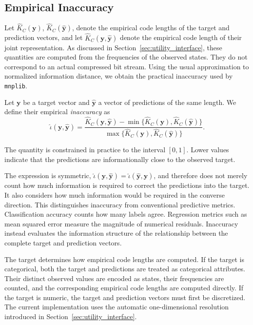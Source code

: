 \subsection*{Empirical Inaccuracy}

Let $\hat K_C(\mathbf{y})$, $\hat K_C(\hat{\mathbf{y}})$, denote the empirical code lengths of the target and prediction vectors, and let $\hat K_C(\mathbf{y},\hat{\mathbf{y}})$ denote the empirical code length of their joint representation. As discussed in Section~\ref{sec:utility_interface}, these quantities are computed from the frequencies of the observed states. They do not correspond to an actual compressed bit stream. Using the usual approximation to normalized information distance, we obtain the practical inaccuracy used by \texttt{mnplib}.

Let $\mathbf{y}$ be a target vector and $\hat{\mathbf{y}}$ a vector of predictions of the same length. We define their empirical \emph{inaccuracy} as
\[
\hat\iota(\mathbf{y},\hat{\mathbf{y}}) = \frac{ \hat K_C(\mathbf{y},\hat{\mathbf{y}})
- \min\{ \hat K_C(\mathbf{y}), \hat K_C(\hat{\mathbf{y}}) \} }{
\max\{ \hat K_C(\mathbf{y}), \hat K_C(\hat{\mathbf{y}}) \} }.
\]

The quantity is constrained in practice to the interval $[0,1]$. Lower values indicate that the predictions are informationally close to the observed target.

The expression is symmetric, $\hat\iota(\mathbf{y},\hat{\mathbf{y}}) = \hat\iota(\hat{\mathbf{y}},\mathbf{y})$, and therefore does not merely count how much information is required to correct the predictions into the target. It also considers how much information would be required in the converse direction. This distinguishes inaccuracy from conventional predictive metrics. Classification accuracy counts how many labels agree. Regression metrics such as mean squared error measure the magnitude of numerical residuals. Inaccuracy instead evaluates the information structure of the relationship between the complete target and prediction vectors.

The target determines how empirical code lengths are computed. If the target is categorical, both the target and predictions are treated as categorical attributes. Their distinct observed values are encoded as states,
their frequencies are counted, and the corresponding empirical code lengths are computed directly. If the target is numeric, the target and prediction vectors must first be discretized. The current implementation uses the automatic one-dimensional resolution introduced in Section~\ref{sec:utility_interface}.

